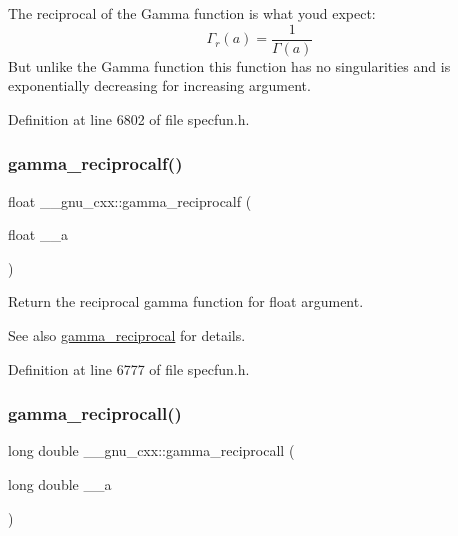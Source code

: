 The reciprocal of the Gamma function is what you\textquotesingle{}d expect\+: \[ \Gamma_r(a) = \frac{1}{\Gamma(a)} \] But unlike the Gamma function this function has no singularities and is exponentially decreasing for increasing argument. 

Definition at line 6802 of file specfun.\+h.

\mbox{\label{group__gnu__math__spec__func_ga10cccd5045490ac24590c094c43107d8}} 
\subsubsection{\texorpdfstring{gamma\+\_\+reciprocalf()}{gamma\_reciprocalf()}}
{\footnotesize\ttfamily float \+\_\+\+\_\+gnu\+\_\+cxx\+::gamma\+\_\+reciprocalf (\begin{DoxyParamCaption}\item[{float}]{\+\_\+\+\_\+a }\end{DoxyParamCaption})\hspace{0.3cm}{\ttfamily [inline]}}

Return the reciprocal gamma function for {\ttfamily  float } argument.

\begin{DoxySeeAlso}{See also}
\hyperlink{group__gnu__math__spec__func_ga641f9bcdb8fc32a9a0ce7a15b5040076}{gamma\+\_\+reciprocal} for details. 
\end{DoxySeeAlso}


Definition at line 6777 of file specfun.\+h.

\mbox{\label{group__gnu__math__spec__func_ga73bfcace13daa8b50e7e7e3f583a2eb0}} 
\subsubsection{\texorpdfstring{gamma\+\_\+reciprocall()}{gamma\_reciprocall()}}
{\footnotesize\ttfamily long double \+\_\+\+\_\+gnu\+\_\+cxx\+::gamma\+\_\+reciprocall (\begin{DoxyParamCaption}\item[{long double}]{\+\_\+\+\_\+a }\end{DoxyParamCaption})\hspace{0.3cm}{\ttfamily [inline]}}

